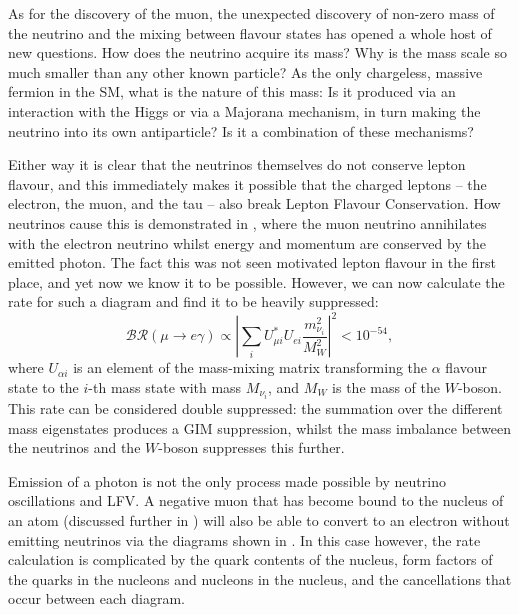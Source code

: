 As for the discovery of the muon, the unexpected discovery  of non-zero mass of the neutrino and the mixing between flavour states has opened a whole host of new questions.
How does the neutrino acquire its mass?
  Why is the mass scale so much smaller than any other known particle?
As the only chargeless, massive fermion in the \ac{SM}, what is the nature of this mass:
Is it produced via an interaction with the Higgs or via a Majorana mechanism, in turn making the neutrino into its own antiparticle?
Is it a combination of these mechanisms?

\FigTheoryMuEConvViaNeutrino
Either way it is clear that the neutrinos themselves do not conserve lepton flavour, and this immediately makes it possible that the charged leptons -- the electron, the muon, and the tau -- also break Lepton Flavour Conservation.
How neutrinos cause this is demonstrated in , where the muon neutrino annihilates with the electron neutrino whilst energy and momentum are conserved by the emitted photon.
The fact this was not seen motivated lepton flavour in the first place, and yet now we know it to be possible.
However, we can now calculate the rate for such a diagram and find it to be heavily suppressed:
\begin{equation}
\mathcal{BR}(\mu\rightarrow{}e\gamma)\propto\left|\sum_iU^*_{\mu i}U_{ei} \frac{m^2_{\nu_i}}{M^2_W}\right|^2 < 10^{-54},
\end{equation}
where $U_{\alpha i}$ is an element of the mass-mixing matrix transforming the $\alpha$ flavour state to the $i$-th mass state with mass $M_{\nu_i}$, and $M_W$ is the mass of the $W$-boson.
This rate can be considered double suppressed: the summation over the different mass eigenstates produces a GIM suppression, whilst the mass imbalance between the neutrinos and the $W$-boson suppresses this further.

Emission of a photon is not the only process made possible by neutrino oscillations and \ac{LFV}.
A negative muon that has become bound to the nucleus of an atom (discussed further in ) will also be able to convert to an electron without emitting neutrinos via the diagrams
shown in .  
In this case however, the rate calculation is complicated by the quark contents of the nucleus, form factors of the quarks in the nucleons and nucleons in the nucleus, and the cancellations that occur between each diagram.

